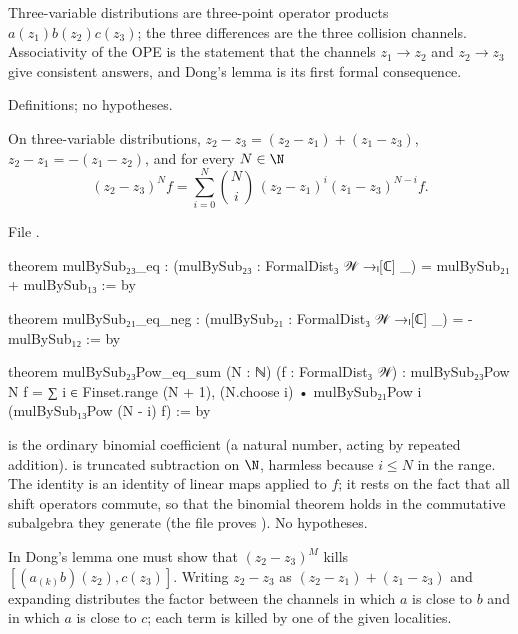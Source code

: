 \begin{physics}
Three-variable distributions are three-point operator products $a(z_1)b(z_2)c(z_3)$; the three differences are the
three collision channels. Associativity of the OPE is the statement that the channels $z_1\to z_2$ and $z_2\to z_3$
give consistent answers, and Dong's lemma is its first formal consequence.
\end{physics}

\begin{status}
Definitions; no hypotheses.
\end{status}

\begin{theorem}\label{l01:thm:fd3binom}
On three-variable distributions, $z_2-z_3 = (z_2-z_1)+(z_1-z_3)$, $z_2-z_1 = -(z_1-z_2)$, and for every $N\in\N$
\begin{equation*}
  (z_2-z_3)^Nf = \sum_{i=0}^{N}\binom Ni\,(z_2-z_1)^i(z_1-z_3)^{N-i}f .
\end{equation*}
\end{theorem}

\noindent File .
\begin{leancode}
theorem mulBySub₂₃_eq : (mulBySub₂₃ : FormalDist₃ 𝒲 →ₗ[ℂ] _) = mulBySub₂₁ + mulBySub₁₃ := by

theorem mulBySub₂₁_eq_neg : (mulBySub₂₁ : FormalDist₃ 𝒲 →ₗ[ℂ] _) = -mulBySub₁₂ := by

theorem mulBySub₂₃Pow_eq_sum (N : ℕ) (f : FormalDist₃ 𝒲) :
    mulBySub₂₃Pow N f
      = ∑ i ∈ Finset.range (N + 1),
          (N.choose i) • mulBySub₂₁Pow i (mulBySub₁₃Pow (N - i) f) := by
\end{leancode}

\begin{dictionary}
 is the ordinary binomial coefficient (a natural number, acting by repeated addition).  is
truncated subtraction on $\N$, harmless because $i\le N$ in the range. The identity is an identity of linear maps
applied to $f$; it rests on the fact that all shift operators commute, so that the binomial theorem holds in the
commutative subalgebra they generate (the file proves ). No hypotheses.
\end{dictionary}

\begin{physics}
In Dong's lemma one must show that $(z_2-z_3)^{M}$ kills $[(a_{(k)}b)(z_2),c(z_3)]$. Writing $z_2-z_3$ as
$(z_2-z_1)+(z_1-z_3)$ and expanding distributes the factor between the channels in which $a$ is close to $b$ and in
which $a$ is close to $c$; each term is killed by one of the given localities.
\end{physics}

